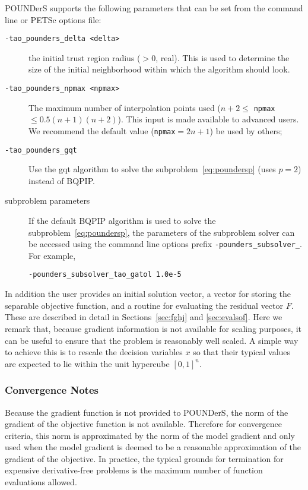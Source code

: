 POUNDerS supports the following parameters that can be set from the
command line or PETSc options file:
\begin{description}
  \item[\texttt{-tao\_pounders\_delta <delta>}] the initial trust region 
  radius ($>0$, real).
  This is  used to determine the size of the initial neighborhood within
  which the algorithm should look. 
  
  \item[\texttt{-tao\_pounders\_npmax <npmax>}] The maximum number of 
  interpolation points used
  ($n+2\leq$ \texttt{npmax} $\leq 0.5(n+1)(n+2)$). This input is made
  available to advanced users. We recommend the default
  value (\texttt{npmax}$=2n+1$) be used by others;

  \item[\texttt{-tao\_pounders\_gqt}] Use the gqt algorithm to solve the
  subproblem~\ref{eq:poundersp} (uses $p=2$) instead of BQPIP.

  \item[subproblem parameters] If the default BQPIP algorithm is used to solve the 
  subproblem~\ref{eq:poundersp}, the parameters of the subproblem solver
  can be accessed using the command line options prefix \texttt{-pounders\_subsolver\_}.  For example, 
\begin{verbatim}
-pounders_subsolver_tao_gatol 1.0e-5
\end{verbatim}  
\end{description}
In addition the user provides an initial solution vector, a vector for storing
the separable objective function, and a routine for evaluating the residual
vector $F$.  These are described in detail in 
Sections~\ref{sec:fghj} and \ref{sec:evalsof}. 
Here we remark that, because gradient information is not available for
scaling purposes, it can be useful to ensure that the problem is
reasonably well scaled. A simple way to achieve this is to rescale the
decision variables $x$ so that their typical values are expected to lie
within the unit hypercube $[0,1]^n$.

\subsubsection{Convergence Notes}
Because the gradient function is not provided to POUNDerS, 
the norm of the gradient of the objective function is not available.
Therefore
for convergence criteria, this norm is approximated by the norm of the
model gradient and only used when the model gradient is deemed to be a
reasonable approximation of the gradient of the objective. In practice, the
typical grounds for termination for expensive derivative-free problems is
the maximum number of function evaluations allowed. 




